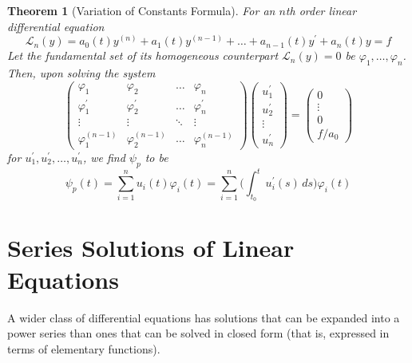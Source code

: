 \documentclass{article}
\newtheorem{theorem}{Theorem}[section]
\theoremstyle{remark}
\theoremstyle{definition}
\begin{document}
      \begin{theorem}[Variation of Constants Formula]
      For an $n$th order linear differential equation 
      \[\mathcal{L}_n (y) = a_0 (t) y^{(n)} + a_1 (t) y^{(n-1)} + \ldots + a_{n-1} (t) y^\prime + a_n (t) y = f\]
      Let the fundamental set of its homogeneous counterpart $\mathcal{L}_n (y) = 0$ be $\varphi_1, \ldots, \varphi_n$. Then, upon solving the system 
      \[\begin{pmatrix}
      \varphi_1 & \varphi_2 & \ldots & \varphi_n \\
      \varphi_1^\prime & \varphi_2^\prime & \ldots & \varphi_n^\prime\\
      \vdots & \vdots & \ddots & \vdots \\
      \varphi_1^{(n-1)} & \varphi_2^{(n-1)} & \ldots & \varphi_n^{(n-1)} 
      \end{pmatrix} \begin{pmatrix}
      u_1^\prime \\ u_2^\prime \\ \vdots \\ u_n^\prime 
      \end{pmatrix} = \begin{pmatrix}
      0 \\ \vdots \\ 0 \\ f / a_0
      \end{pmatrix}\]
      for $u_1^\prime, u_2^\prime, \ldots, u_n^\prime$, we find $\psi_p$ to be
      \[\psi_p (t) = \sum_{i=1}^n u_i (t) \varphi_i(t) = \sum_{i=1}^n \Big( \int_{t_0}^t u_i^\prime (s)\,ds \Big) \varphi_i (t)\]
      \end{theorem}

\section{Series Solutions of Linear Equations}

  A wider class of differential equations has solutions that can be expanded into a power series than ones that can be solved in closed form (that is, expressed in terms of elementary functions). 
\end{document}
